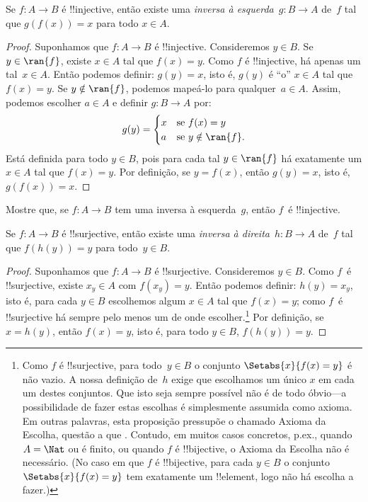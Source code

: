 \documentclass[../../../include/open-logic-section]{subfiles}
\begin{document}
\begin{prop}
Se $f\colon A \to B$ é !!{injective}, então existe uma \emph{inversa à
esquerda}~$g\colon B \to A$ de~$f$ tal que $g(f(x)) = x$ para todo $x
\in A$.
\end{prop}

\begin{proof}
Suponhamos que $f\colon A \to B$ é !!{injective}. Consideremos $y \in B$.
Se $y \in \ran{f}$, existe $x \in A$ tal que $f(x) = y$. Como
$f$ é !!{injective}, há apenas um tal~$x \in A$. Então podemos
definir: $g(y) = x$, isto é, $g(y)$ é ``o'' $x \in A$ tal que $f(x)
= y$. Se $y \notin \ran{f}$, podemos mapeá-lo para qualquer~$a \in A$. Assim,
podemos escolher $a \in A$ e definir $g\colon B \to A$ por:
\[
g(y) = \begin{cases}
    x & \text{se $f(x) = y$}\\
    a & \text{se $y \notin \ran{f}$.}
\end{cases}
\]
Está definida para todo $y \in B$, pois para cada tal $y \in \ran{f}$
há exatamente um $x \in A$ tal que $f(x) = y$. Por definição, se
$y = f(x)$, então $g(y) = x$, isto é, $g(f(x)) = x$.
\end{proof}

\begin{prob}
Mostre que, se $f\colon A \to B$ tem uma inversa à esquerda~$g$, então $f$~é
!!{injective}.
\end{prob}

\begin{prop}
    Se $f\colon A \to B$ é !!{surjective}, então existe uma
    \emph{inversa à direita}~$h\colon B \to A$ de~$f$ tal que $f(h(y)) =
    y$ para todo~$y \in B$.
\end{prop}

\begin{proof}
Suponhamos que $f\colon A \to B$ é !!{surjective}. Consideremos $y \in
B$. Como $f$~é !!{surjective}, existe $x_y \in A$ com $f(x_y)
= y$. Então podemos definir: $h(y) = x_y$, isto é, para cada $y \in B$
escolhemos algum $x \in A$ tal que $f(x) = y$; como $f$~é !!{surjective}
há sempre pelo menos um de onde escolher.\footnote{Como $f$ é
!!{surjective}, para todo~$y \in B$ o conjunto $\Setabs{x}{f(x) = y}$ é
não vazio. A nossa definição de~$h$ exige que escolhamos um único $x$
em cada um destes conjuntos. Que isto seja sempre possível não é de todo
óbvio---a possibilidade de fazer estas escolhas é simplesmente assumida como axioma.
Em outras palavras, esta proposição pressupõe o chamado Axioma da
Escolha, questão a que .
Contudo, em muitos casos concretos, p.ex., quando $A = \Nat$ ou é finito, ou quando $f$ é !!{bijective},
o Axioma da Escolha não é necessário. (No caso em que $f$ é !!{bijective}, para cada $y \in B$ o conjunto
$\Setabs{x}{f(x) = y}$ tem exatamente um !!{element}, logo não há escolha a fazer.)}
Por definição, se $x = h(y)$,
então $f(x) = y$, isto é, para todo $y \in B$, $f(h(y)) = y$.
\end{proof}
\end{document}
